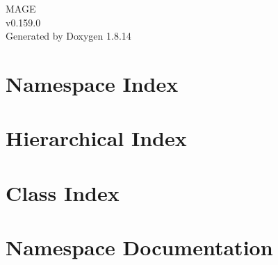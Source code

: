 \documentclass[twoside]{book}
\newcommand{\+}{\discretionary{\mbox{\scriptsize$\hookleftarrow$}}{}{}}
\newcommand{\clearemptydoublepage}{%
  \newpage{\pagestyle{empty}\cleardoublepage}%
}
\begin{document}
\hypersetup{pageanchor=false,
             bookmarksnumbered=true,
             pdfencoding=unicode
            }
\begin{titlepage}
\vspace*{7cm}
\begin{center}%
{\Large M\+A\+GE \\[1ex]\large v0.\+159.\+0 }\\
\vspace*{1cm}
{\large Generated by Doxygen 1.8.14}\\
\end{center}
\end{titlepage}
\clearemptydoublepage
{}
\tableofcontents
\clearemptydoublepage
{}
\hypersetup{pageanchor=true}

\chapter{Namespace Index}

\chapter{Hierarchical Index}

\chapter{Class Index}

\chapter{Namespace Documentation}










\end{document}
